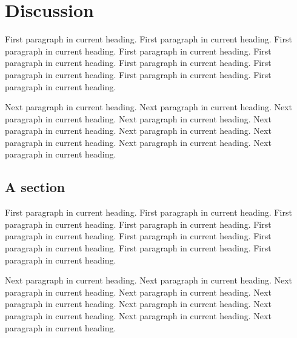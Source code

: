 \chapter{Discussion}

\noindent   %
First paragraph in current heading. First paragraph in current heading.
First paragraph in current heading. First paragraph in current heading.
First paragraph in current heading. First paragraph in current heading.
First paragraph in current heading. First paragraph in current heading.
First paragraph in current heading.

Next paragraph in current heading. Next paragraph in current heading.
Next paragraph in current heading. Next paragraph in current heading.
Next paragraph in current heading. Next paragraph in current heading.
Next paragraph in current heading. Next paragraph in current heading.
Next paragraph in current heading.

\section{A section}

\noindent   %
First paragraph in current heading. First paragraph in current heading.
First paragraph in current heading. First paragraph in current heading.
First paragraph in current heading. First paragraph in current heading.
First paragraph in current heading. First paragraph in current heading.
First paragraph in current heading.

Next paragraph in current heading. Next paragraph in current heading.
Next paragraph in current heading. Next paragraph in current heading.
Next paragraph in current heading. Next paragraph in current heading.
Next paragraph in current heading. Next paragraph in current heading.
Next paragraph in current heading.


